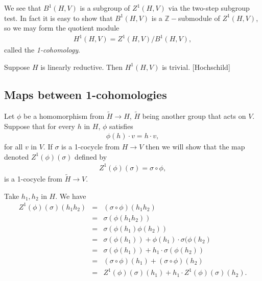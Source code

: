 We see that $B^1(H, V)$ is a subgroup of $Z^1(H, V)$ via the two-step subgroup test. In fact it is easy to show that $B^1(H, V)$ is a $\mathbb{Z}-$submodule of $Z^1(H, V)$, so we may form the quotient module
\begin{eqnarray*}
	H^1\left(H, V\right) = Z^1\left(H, V\right) / B^1\left(H, V\right),
\end{eqnarray*}
called the \emph{1-cohomology}.
\begin{lemma} Suppose $H$ is linearly reductive. Then $H^1(H, V)$ is trivial. [Hochschild]
\end{lemma}

\subsection{Maps between 1-cohomologies}
Let $\phi$ be a homomorphism from $\tilde{H}\rightarrow H$, $\tilde{H}$ being another group that acts on $V$. Suppose that for every $h$ in $H$, $\phi$ satisfies
\begin{eqnarray*}
	\phi(h)\cdot v = h\cdot v,
\end{eqnarray*}
for all $v$ in $V$. If $\sigma$ is a 1-cocycle from $H\rightarrow V$ then we will show that the map denoted $Z^1(\phi)(\sigma)$ defined by
\begin{eqnarray*}
	Z^1(\phi)(\sigma) = \sigma \circ \phi,
\end{eqnarray*}
is a 1-cocycle from $\tilde{H}\rightarrow V$.

Take $h_1, h_2$ in $H$. We have
\begin{eqnarray*}
	Z^1(\phi)(\sigma)(h_1h_2) &=& (\sigma \circ \phi)(h_1h_2) \\
		&=& \sigma(\phi(h_1h_2)) \\
		&=& \sigma(\phi(h_1)\phi(h_2)) \\
		&=& \sigma(\phi(h_1)) + \phi(h_1)\cdot\sigma(\phi(h_2) \\
		&=& \sigma(\phi(h_1)) + h_1\cdot\sigma(\phi(h_2)) \\
		&=& (\sigma \circ \phi)(h_1) + (\sigma \circ \phi)(h_2) \\
		&=& Z^1(\phi)(\sigma)(h_1) + h_1\cdot Z^1(\phi)(\sigma)(h_2).
\end{eqnarray*}

